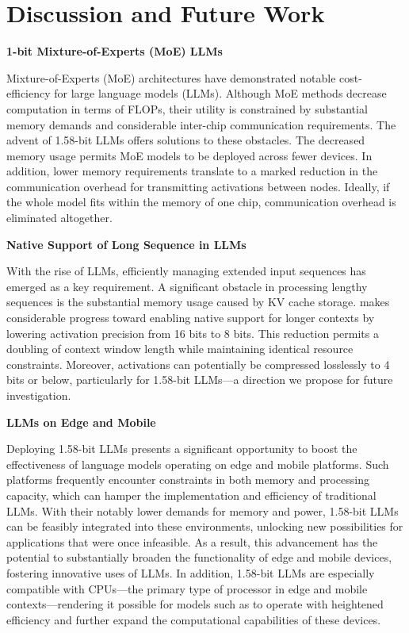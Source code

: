 \section{Discussion and Future Work}

\textbf{1-bit Mixture-of-Experts (MoE) LLMs}

Mixture-of-Experts (MoE) architectures have demonstrated notable cost-efficiency for large language models (LLMs). Although MoE methods decrease computation in terms of FLOPs, their utility is constrained by substantial memory demands and considerable inter-chip communication requirements. The advent of 1.58-bit LLMs offers solutions to these obstacles. The decreased memory usage permits MoE models to be deployed across fewer devices. In addition, lower memory requirements translate to a marked reduction in the communication overhead for transmitting activations between nodes. Ideally, if the whole model fits within the memory of one chip, communication overhead is eliminated altogether.

\textbf{Native Support of Long Sequence in LLMs}

With the rise of LLMs, efficiently managing extended input sequences has emerged as a key requirement. A significant obstacle in processing lengthy sequences is the substantial memory usage caused by KV cache storage.  makes considerable progress toward enabling native support for longer contexts by lowering activation precision from 16 bits to 8 bits. This reduction permits a doubling of context window length while maintaining identical resource constraints. Moreover, activations can potentially be compressed losslessly to 4 bits or below, particularly for 1.58-bit LLMs—a direction we propose for future investigation.

\textbf{LLMs on Edge and Mobile}

Deploying 1.58-bit LLMs presents a significant opportunity to boost the effectiveness of language models operating on edge and mobile platforms. Such platforms frequently encounter constraints in both memory and processing capacity, which can hamper the implementation and efficiency of traditional LLMs. With their notably lower demands for memory and power, 1.58-bit LLMs can be feasibly integrated into these environments, unlocking new possibilities for applications that were once infeasible. As a result, this advancement has the potential to substantially broaden the functionality of edge and mobile devices, fostering innovative uses of LLMs. In addition, 1.58-bit LLMs are especially compatible with CPUs—the primary type of processor in edge and mobile contexts—rendering it possible for models such as  to operate with heightened efficiency and further expand the computational capabilities of these devices.

